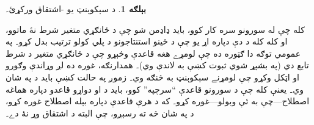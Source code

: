 \documentclass[12pt,a4paper,oneside]{report}
\newcommand{\olfileid}[3]{\gdef\pspart{#1}\gdef\pschapter{#2}\gdef\pssection{#3}}
\gdef\pspart{#2}\gdef\pschapter{#3}\gdef\pssection{}%
\theoremstyle{definition}
\newtheorem{ex}[thm]{بېلګه}
\begin{document}
\label{olpseg:OLP-0076-B004:start}
\olfileid{fol}{seq}{prq}
\label{olpseg:OLP-0076-B004:end}

\label{olpseg:OLP-0076-B005:start}
\label{olpseg:OLP-0076-B005:end}

\label{olpseg:OLP-0076-B006:start}
\begin{ex}
د سېکوېنټ \LR{$\lexists[x][\lnot !A(x)]
\Sequent \lnot \lforall[x][!A(x)]$} يو
-اشتقاق ورکړئ۔
\label{olpseg:OLP-0076-B006:end}

\label{olpseg:OLP-0076-B007:start}
کله چې له سورونو سره کار کوو، بايد ډاډمن شو چې د ځانګړي متغير شرط
نۀ ماتوو، او کله کله د دې دپاره اړ يو چې د ځينو استنتاجونو د پلي
کولو ترتيب بدل کړو۔ په عمومي توګه دا ګټوره ده چې لومړے هغه قاعدې
وڅېړو چې د ځانګړي متغير د شرط تابع دي (په بشپړ شوي ثبوت کښې به
لاندې وي)۔ همدارنګه، غوره ده لږ وړاندې وګورو او اټکل وکړو چې
لومړنے سېکوېنټ به څنګه وي۔ زموږ په حالت کښې بايد د
 په شان وي۔ يعنې کله چې د سورونو قاعدې
“سرچپه” کوو، بايد د \LR{$\lforall$} او \LR{$\lexists$} دواړو قاعدو دپاره
هماغه اصطلاح---چې  به ئې وبولو---غوره کړو۔ که د هرې قاعدې
دپاره بېله اصطلاح غوره کړو، د  په شان څه
ته رسېږو، چې البته د اشتقاق وړ نۀ دے۔
\label{olpseg:OLP-0076-B007:end}


\end{ex}
\end{document}
